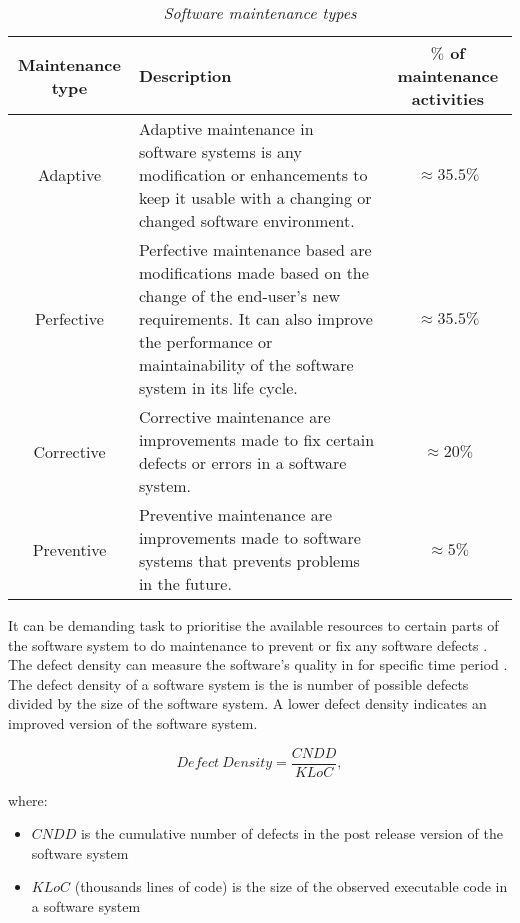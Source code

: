 \begin{table}[!htb]
	\centering
	\small
	\caption[Software maintenance types]
	{\textit{Software maintenance types \cite{Ping2010,Hasan2012,Mamone1994}}}
	\label{tbl:CH1_MaintenanceTypes}
	\begin{tabularx}{\textwidth}{|c|X|c|}
		\hline
		\textbf{Maintenance type} & \textbf{Description} & \textbf{$\%$ of maintenance activities} \\ \hline
		Adaptive & \raggedright Adaptive maintenance in software systems is any modification or enhancements to keep it usable with a changing or changed software environment. & $\approx 35.5\%$ \\ \hline
		Perfective & Perfective maintenance based are modifications made based on the change of the end-user's new requirements. It can also improve the performance or maintainability of the software system in its life cycle. & $\approx 35.5\%$ \\ \hline
		Corrective & \raggedright Corrective maintenance are improvements made to fix certain defects or errors in a software system. & $\approx 20\%$ \\ \hline
		Preventive & \raggedright  Preventive maintenance are improvements made to software systems that prevents problems in the future. & $\approx 5\%$ \\ \hline
	\end{tabularx}
\end{table}

It can be demanding task to prioritise the available resources to certain parts of the software system to do maintenance to prevent or fix any software defects \cite{Mamone1994, Hasan2012}. The defect density can measure the software's quality in  for specific time period \cite{Shah2012, Alenezi2016}. The defect density of a software system is the is number of possible defects divided by the size of the software system.  A lower defect density indicates an improved version of the software system.

\begin{equation}
	\label{eq:Defect_Density}
	Defect~Density = \frac{CNDD}{KLoC},
\end{equation}

where:

\begin{itemize}
	\item $CNDD$ is the cumulative number of defects in the post release version of the software system
	\item $KLoC$ (thousands lines of code) is the size of the observed executable code in a software system 
\end{itemize}


